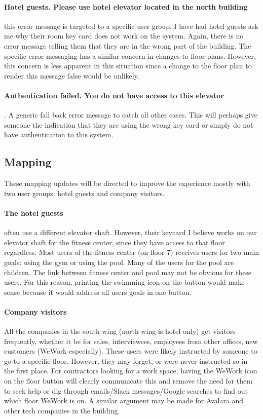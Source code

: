 \paragraph{Hotel guests. Please use hotel elevator located in the north building} this error message is targeted to a specific user group. I have had hotel guests ask me why their room key card does not work on the system. Again, there is no error message telling them that they are in the wrong part of the building. The specific error messaging has a similar concern in changes to floor plans. However, this concern is less apparent in this situation since a change to the floor plan to render this message false would be unlikely.

\paragraph{Authentication failed. You do not have access to this elevator}. A generic fall back error message to catch all other cases. This will perhaps give someone the indication that they are using the wrong key card or simply do not have authentication to this system.

\subsection{Mapping}
These mapping updates will be directed to improve the experience mostly with two user groups: hotel guests and company visitors.

\paragraph{The hotel guests} often use a different elevator shaft. However, their keycard I believe works on our elevator shaft for the fitness center, since they have access to that floor regardless. Most users of the fitness center (on floor 7) receives users for two main goals: using the gym or using the pool. Many of the users for the pool are children. The link between fitness center and pool may not be obvious for these users. For this reason, printing the swimming icon on the button would make sense because it would address all users goals in one button.

\paragraph{Company visitors} All the companies in the south wing (north wing is hotel only) get visitors frequently, whether it be for sales, interviewees, employees from other offices, new customers (WeWork especially). These users were likely instructed by someone to go to a specific floor. However, they may forget, or were never instructed so in the first place. For contractors looking for a work space, having the WeWork icon on the floor button will clearly communicate this and remove the need for them to seek help or dig through emails/Slack messages/Google searches to find out which floor WeWork is on. A similar argument may be made for Avalara and other tech companies in the building.

